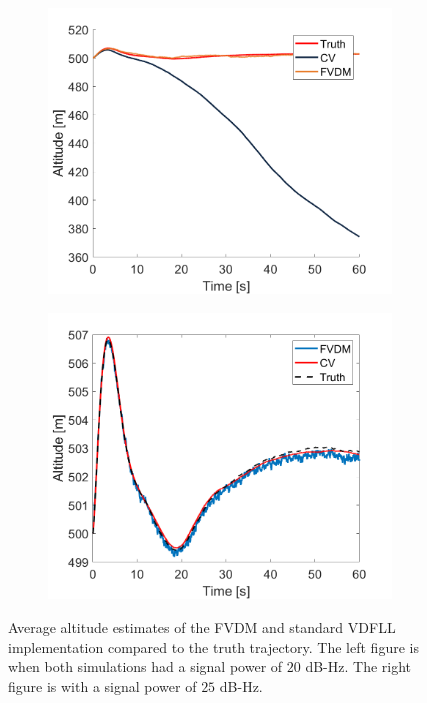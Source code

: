 \begin{figure}[!ht]
    \begin{subfigure}{.45\textwidth}
        \centering
        \includegraphics[width=1\linewidth]{Figures/straight/20/ALTITUDE.png}
    \end{subfigure}
    \begin{subfigure}{.45\textwidth}
        \centering
        \includegraphics[width=1\linewidth]{Figures/straight/25/ALTITUDE.png}
    \end{subfigure}
    \caption{Average altitude estimates of the FVDM and standard VDFLL implementation compared to the truth trajectory. The left figure is when both simulations had a signal power of \(20\) dB-Hz. The right figure is with a signal power of \(25\) dB-Hz.}\label{fig:Altitude1}
\end{figure}

